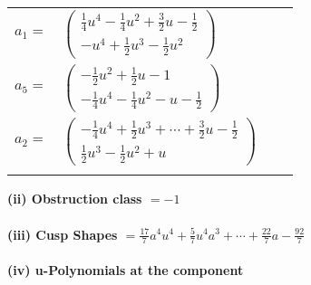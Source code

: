 \documentclass[1p]{elsarticle_modified}
\theoremstyle{definition}
\begin{document}
\begin{tabular}{m{7pt} m{180pt} m{7pt} m{180pt} }
\flushright $a_{1}=$&$\begin{pmatrix}\frac{1}{4} u^4-\frac{1}{4} u^2+\frac{3}{2} u-\frac{1}{2}\\- u^4+\frac{1}{2} u^3-\frac{1}{2} u^2\end{pmatrix}$ \\
\flushright $a_{5}=$&$\begin{pmatrix}-\frac{1}{2} u^2+\frac{1}{2} u-1\\-\frac{1}{4} u^4-\frac{1}{4} u^2- u-\frac{1}{2}\end{pmatrix}$ \\
\flushright $a_{2}=$&$\begin{pmatrix}-\frac{1}{4} u^4+\frac{1}{2} u^3+\cdots+\frac{3}{2} u-\frac{1}{2}\\\frac{1}{2} u^3-\frac{1}{2} u^2+u\end{pmatrix}$\\&\end{tabular}
\flushleft \textbf{(ii) Obstruction class $= -1$}\\~\\
\flushleft \textbf{(iii) Cusp Shapes $= \frac{17}{7} a^4 u^4+\frac{5}{7} u^4 a^3+\cdots+\frac{22}{7} a-\frac{92}{7}$}\\~\\
\newpage\renewcommand{\arraystretch}{1}
\flushleft \textbf{(iv) u-Polynomials at the component}\newline \\
\end{document}

